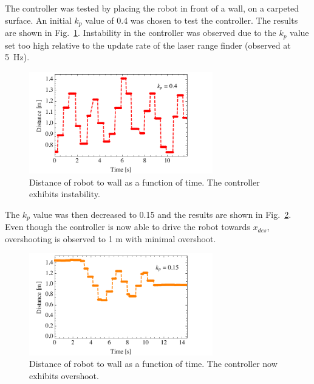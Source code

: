 \documentclass[conference]{IEEEtran}
\begin{document}
The controller was tested by placing the robot in front of a wall, on a carpeted surface.
An initial $k_p$ value of 0.4 was chosen to test the controller. The results are shown in
Fig.~\ref{fig:unstable}. Instability in the controller was observed due to the $k_p$ value
set too high relative to the update rate of the laser range finder (observed at
\SI{5}{\Hz}).
%
\begin{figure}[h]
  \centering
  \includegraphics[width = 8cm]{figures/unstable}
  \caption{Distance of robot to wall as a function of time.
           The controller exhibits instability.}
   \label{fig:unstable}
\end{figure}
%
The $k_p$ value was then decreased to 0.15 and the results are shown in
Fig.~\ref{fig:semi_stable}. Even though the controller is now able to drive the robot
towards $x_{des}$, overshooting is observed to 1 m with minimal overshoot.
\begin{figure}[h]
  \centering
  \includegraphics[width = 8cm]{figures/semi_stable}
  \caption{Distance of robot to wall as a function of time.
           The controller now exhibits overshoot.}
   \label{fig:semi_stable}
\end{figure}
\end{document}
